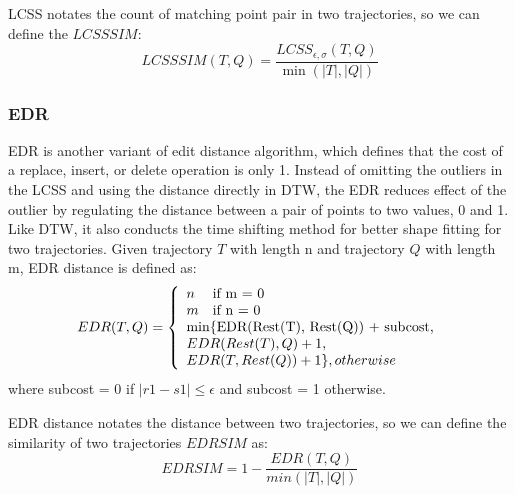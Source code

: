 LCSS notates the count of matching point pair in two trajectories, so we can define the $LCSSSIM$:
\begin{equation}\label{sim:less}
	LCSSSIM(T,Q)=\frac{LCSS_{\epsilon ,\sigma }(T,Q)}{\min(|T|, |Q|)}
\end{equation}

\subsubsection{EDR}
EDR is another variant of edit distance algorithm, which defines that the cost of a replace, insert, or delete operation is only 1. Instead of omitting the outliers in the LCSS and using the distance directly in DTW, the EDR reduces effect of the outlier by regulating the distance between a pair of points to two values, 0 and 1. Like DTW, it also conducts the time shifting method for better shape fitting for two trajectories. Given trajectory $T$ with length n and trajectory $Q$ with length m, EDR distance is defined as:
\begin{equation}
	EDR(T, Q) = \left\{
	\begin{array}{ll}
		n & \text{if m = 0} \\
		m & \text{if n = 0} \\
		\multicolumn{2}{l}{\text{min\{EDR(Rest(T), Rest(Q)) + subcost,}} \\
		\multicolumn{2}{l}{EDR(Rest(T), Q) + 1, } \\
		\multicolumn{2}{l}{EDR(T, Rest(Q)) + 1\}, otherwise}  
	\end{array}
	\right.
\end{equation}
where subcost = 0 if $|r1 - s1| \leq \epsilon$ and subcost = 1 otherwise.

EDR distance notates the distance between two trajectories, so we can define the similarity of two trajectories $EDRSIM$ as:
\begin{equation}
	EDRSIM=1 - \frac{EDR(T,Q)}{min(|T|, |Q|)}
\end{equation}